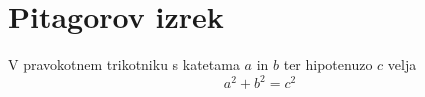 \documentclass{article}
\begin{document}
\section*{Pitagorov izrek}
V pravokotnem trikotniku s katetama \(a\) in \(b\) ter hipotenuzo \(c\) velja
\[ a^2 + b^2 = c^2 \]
\end{document}
